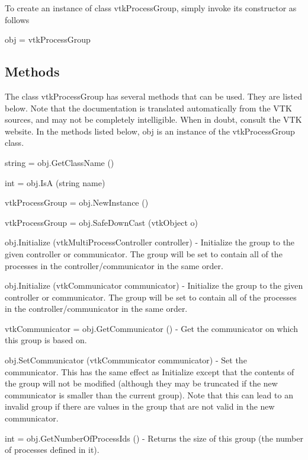 To create an instance of class vtk\-Process\-Group, simply invoke its constructor as follows \begin{DoxyVerb}  obj = vtkProcessGroup
\end{DoxyVerb}
 \hypertarget{vtkwidgets_vtkxyplotwidget_Methods}{}\subsection{Methods}\label{vtkwidgets_vtkxyplotwidget_Methods}
The class vtk\-Process\-Group has several methods that can be used. They are listed below. Note that the documentation is translated automatically from the V\-T\-K sources, and may not be completely intelligible. When in doubt, consult the V\-T\-K website. In the methods listed below, {\ttfamily obj} is an instance of the vtk\-Process\-Group class. 
\begin{DoxyItemize}
\item {\ttfamily string = obj.\-Get\-Class\-Name ()}  
\item {\ttfamily int = obj.\-Is\-A (string name)}  
\item {\ttfamily vtk\-Process\-Group = obj.\-New\-Instance ()}  
\item {\ttfamily vtk\-Process\-Group = obj.\-Safe\-Down\-Cast (vtk\-Object o)}  
\item {\ttfamily obj.\-Initialize (vtk\-Multi\-Process\-Controller controller)} -\/ Initialize the group to the given controller or communicator. The group will be set to contain all of the processes in the controller/communicator in the same order.  
\item {\ttfamily obj.\-Initialize (vtk\-Communicator communicator)} -\/ Initialize the group to the given controller or communicator. The group will be set to contain all of the processes in the controller/communicator in the same order.  
\item {\ttfamily vtk\-Communicator = obj.\-Get\-Communicator ()} -\/ Get the communicator on which this group is based on.  
\item {\ttfamily obj.\-Set\-Communicator (vtk\-Communicator communicator)} -\/ Set the communicator. This has the same effect as Initialize except that the contents of the group will not be modified (although they may be truncated if the new communicator is smaller than the current group). Note that this can lead to an invalid group if there are values in the group that are not valid in the new communicator.  
\item {\ttfamily int = obj.\-Get\-Number\-Of\-Process\-Ids ()} -\/ Returns the size of this group (the number of processes defined in it).  

\end{DoxyItemize}
